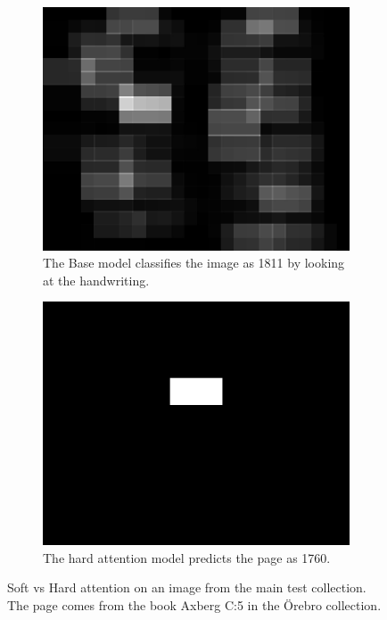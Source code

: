 \begin{figure}
    \begin{subfigure}[t]{0.45\textwidth}
        \centering
        \includegraphics[scale=1.0]{resources/SWE_attention/SoftAtt/att_S3HY-DRC3-H5L.jpg}
        \caption{The Base model classifies the image as 1811 by looking at the handwriting.}
    \end{subfigure} \quad %
    \begin{subfigure}[t]{0.45\textwidth}
        \centering    \includegraphics[scale=1.0]{resources/SWE_attention/HardAtt/att_S3HY-DRC3-H5L.jpg}
        \caption{The hard attention model predicts the page as 1760.}
    \end{subfigure}

    \caption{Soft vs Hard attention on an image from the main test collection. The page comes from the book Axberg C:5 in the Örebro collection.}
    \label{fig:attention_dep_H5L}
\end{figure}
